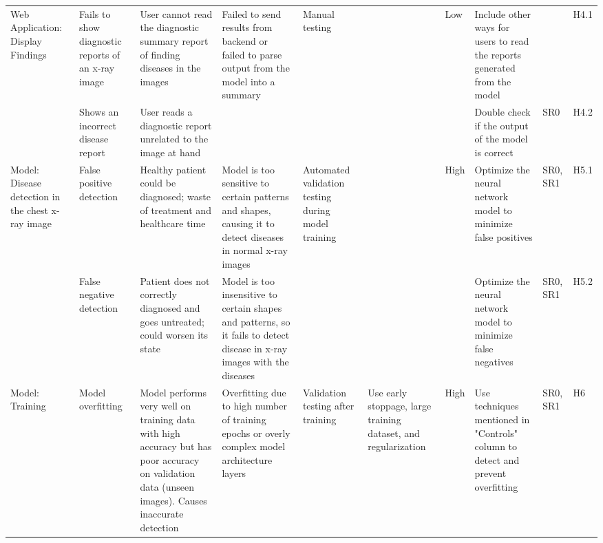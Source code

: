 \documentclass{article}
\begin{document}
\begin{landscape}
\begin{table}[hp]
\begin{footnotesize}
\begin{tabular}{|p{0.8in}|p{1in}|p{1.2in}|p{1.5in}|p{0.6in}|p{0.8in}|p{0.3in}|p{2.2in}|p{0.2in}|p{0.2in}|}
        \multirow{2}{1in}{Web Application: Display Findings} &
        Fails to show diagnostic reports of an x-ray image &
        User cannot read the diagnostic summary report of finding diseases in the images &
        \multirow{2}{1.5in}{Failed to send results from backend or failed to parse output from the
        model into a summary} &
        \multirow{2}{0.6in}{Manual testing} & &
        \multirow{2}{0.3in}{Low} &
        Include other ways for users to read the reports generated from the model & &
        H4.1 \\
        \cline{2-3}\cline{8-10}
        &
        Shows an incorrect disease report &
        User reads a diagnostic report unrelated to the image at hand & & & & &
        Double check if the output of the model is correct &
        SR0 &
        H4.2 \\
        \hline

        \multirow{2}{1in}{Model: Disease detection in the chest x-ray image} &
        False positive detection &
        Healthy patient could be diagnosed; waste of treatment and healthcare time &
        Model is too sensitive to certain patterns and shapes, causing it to detect diseases in
        normal x-ray images &
        \multirow{2}{0.6in}{Automated validation testing during model training} & &
        \multirow{2}{0.3in}{High} &
        Optimize the neural network model to minimize false positives &
        SR0, SR1 &
        H5.1 \\
        \cline{2-4}\cline{8-10}
        &
        False negative detection &
        Patient does not correctly diagnosed and goes untreated; could worsen its state &
        Model is too insensitive to certain shapes and patterns, so it fails to detect disease in
        x-ray images with the diseases & & & &
        Optimize the neural network model to minimize false negatives &
        SR0, SR1 &
        H5.2 \\
        \hline

        Model: Training &
        Model overfitting &
        Model performs very well on training data with high accuracy but has poor accuracy on
        validation data (unseen images). Causes inaccurate detection &
        Overfitting due to high number of training epochs or overly complex model architecture
        layers &
        Validation testing after training &
        Use early stoppage, large training dataset, and regularization &
        High &
        Use techniques mentioned in "Controls" column to detect and prevent overfitting &
        SR0, SR1 &
        H6 \\
        \bottomrule
      \end{tabular}
    \end{footnotesize}
  \end{table}
\end{landscape}
\restoregeometry
\end{document}
